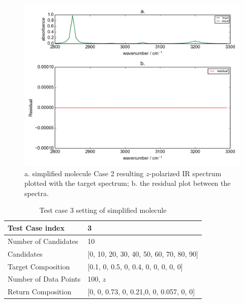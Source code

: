 \begin{figure}[!ht] 
\includegraphics[scale=0.7]{Figures/toy_model_result_plotting_ir_cos_4candi_1.png}
\caption{a. simplified molecule Case 2 resulting $z$-polarized IR spectrum plotted with the target spectrum; b. the residual plot between the spectra.}
\label{fig:3.2}
\end{figure}

\begin{table} 
\begin{center}
\begin{tabular}{| l | p{7cm} | }
\hline
Test Case index & 3  \\
\hline
Number of Candidates & 10   \\
\hline
Candidates & [0, 10, 20, 30, 40, 50, 60, 70, 80, 90]  \\
\hline
Target Composition & [0.1, 0, 0.5, 0, 0.4, 0, 0, 0, 0, 0] \\
\hline
Number of Data Points & 100, $z$ \\
\hline
Return Composition & [0, 0, 0.73, 0, 0.21,0, 0, 0.057, 0, 0] \\
\hline
\end{tabular}
\end{center}
\caption{Test case 3 setting of simplified molecule}
\label{tab:3.2}
\end{table}	

